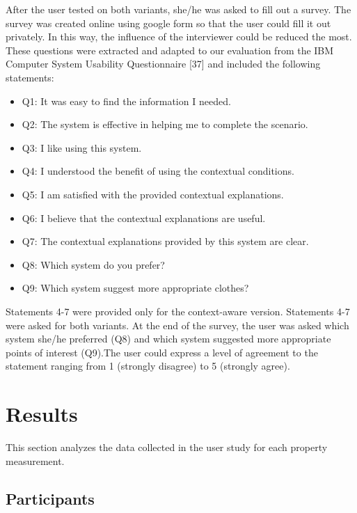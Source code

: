 \begin{enumerate}
After the user tested on both variants, she/he was asked to fill out a survey. The survey was created online using google form so that the user could fill it out privately. In this way, the influence of the interviewer could be reduced the most. These questions were extracted and adapted to our evaluation from the IBM Computer System Usability Questionnaire [37] and included the following statements:

\begin{itemize}
\item{Q1: It was easy to find the information I needed. }
\item{Q2: The system is effective in helping me to complete the scenario. }
\item{Q3: I like using this system.}
\item{Q4: I understood the benefit of using the contextual conditions. }
\item{Q5: I am satisfied with the provided contextual explanations. }
\item{Q6: I believe that the contextual explanations are useful.}
\item{Q7: The contextual explanations provided by this system are clear. }
\item{Q8: Which system do you prefer?}
\item{Q9: Which system suggest more appropriate clothes?}
\end{itemize}

Statements 4-7 were provided only for the context-aware version. Statements 4-7 were asked for both variants. At the end of the survey, the user was asked which system she/he preferred (Q8) and which system suggested more appropriate points of interest (Q9).The user could express a level of agreement to the statement ranging from 1 (strongly disagree) to 5 (strongly agree). 

\end{enumerate}

\section{Results} \label{sec:results}

This section analyzes the data collected in the user study for each property measurement.

\subsection{Participants} \label{sec:results_p}

